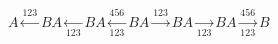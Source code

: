 $
      A \xleftarrow{123} B
      A \xleftarrow[123]{} B
      A \xleftarrow[123]{456} B

      A \xrightarrow{123} B
      A \xrightarrow[123]{} B
      A \xrightarrow[123]{456} B
$
